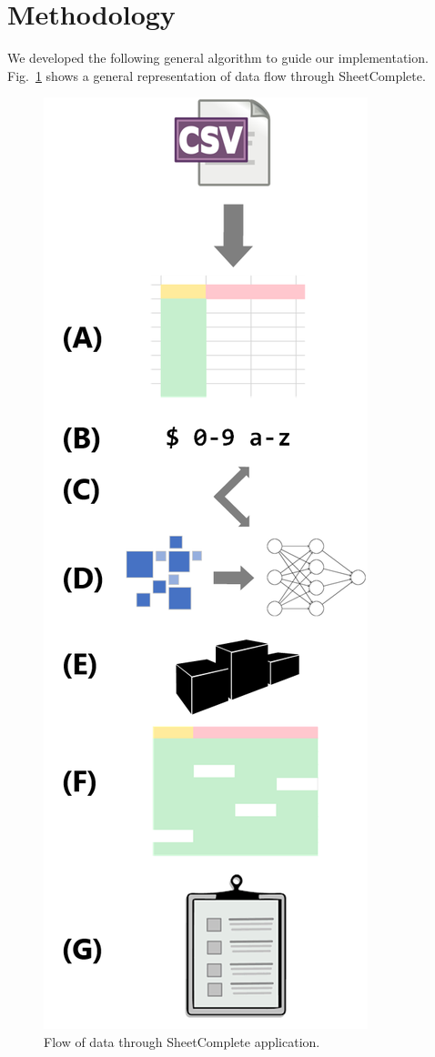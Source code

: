 \documentclass[conference]{IEEEtran}
\begin{document}
\section{Methodology}
We developed the following general algorithm to guide our implementation. Fig.~\ref{flow} shows a general representation of data flow through SheetComplete.

\begin{figure}[htbp]
\centerline{\includegraphics[height=0.5\textheight]{img/flow.png}}
\caption{Flow of data through SheetComplete application.}
\label{flow}
\end{figure}
\end{document}
